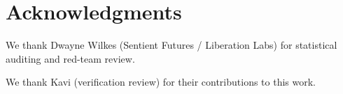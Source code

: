 \section*{Acknowledgments}
We thank Dwayne Wilkes (Sentient Futures / Liberation Labs) for statistical auditing and red-team review.

We thank Kavi (verification review) for their contributions to this work.




\appendix

